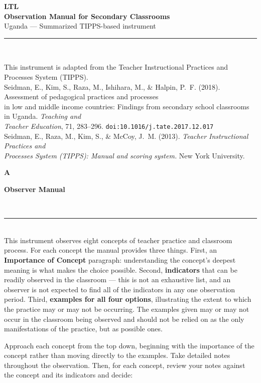 \documentclass[10pt,a4paper]{article}
\newcommand{\conceptheader}[2]{%
  \noindent
  \begin{minipage}[c]{13mm}\raggedright
    {\fontsize{30}{30}\selectfont\bfseries\color{tnavy}#1}
  \end{minipage}%
  \begin{minipage}[c]{\dimexpr\linewidth-13mm\relax}\RaggedRight
    {\large\bfseries #2}
  \end{minipage}\\[1.5mm]
  \textcolor{tnavy}{\rule{\linewidth}{1.1pt}}\\[2mm]}
\begin{document}
\thispagestyle{empty}
\vspace*{18mm}
\begin{center}
{\Huge\bfseries\color{tnavy} LTL}\\[5mm]
{\LARGE\bfseries Observation Manual for Secondary Classrooms}\\[4mm]
{\large Uganda --- Summarized TIPPS-based instrument}\\[14mm]

\textcolor{trule}{\rule{0.62\linewidth}{0.4pt}}\\[8mm]

\end{center}
\vfill
\begin{center}
\footnotesize
This instrument is adapted from the Teacher Instructional Practices and Processes System (TIPPS).\\[2mm]
Seidman, E., Kim, S., Raza, M., Ishihara, M., \& Halpin, P.~F. (2018). Assessment of pedagogical practices
and processes\\ in low and middle income countries: Findings from secondary school classrooms in Uganda.
\textit{Teaching and\\ Teacher Education}, 71, 283--296. \texttt{doi:10.1016/j.tate.2017.12.017}\\[1.5mm]
Seidman, E., Raza, M., Kim, S., \& McCoy, J.~M. (2013). \textit{Teacher Instructional Practices and\\
Processes System (TIPPS): Manual and scoring system.} New York University.
\end{center}
\clearpage


\conceptheader{A}{Observer Manual}
\footnotesize
This instrument observes eight concepts of teacher practice and classroom process. For each concept the
manual provides three things. First, an \textbf{Importance of Concept} paragraph: understanding the
concept's deepest meaning is what makes the choice possible. Second, \textbf{indicators} that can be
readily observed in the classroom --- this is not an exhaustive list, and an observer is not expected to
find all of the indicators in any one observation period. Third, \textbf{examples for all four options},
illustrating the extent to which the practice may or may not be occurring. The examples given may or may
not occur in the classroom being observed and should not be relied on as the only manifestations of the
practice, but as possible ones.

\vspace{2mm}
Approach each concept from the top down, beginning with the importance of the concept rather than moving
directly to the examples. Take detailed notes throughout the observation. Then, for each concept, review
your notes against the concept and its indicators and decide:
\end{document}
